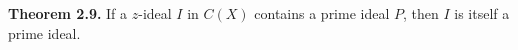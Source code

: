 \textbf{Theorem 2.9.} If a $z$-ideal $I$ in $C(X)$ contains a prime ideal $P$, then $I$ is itself a prime ideal.
